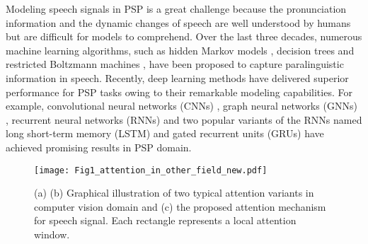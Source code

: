 \documentclass[lettersize,journal]{IEEEtran}
\begin{document}
Modeling speech signals in PSP is a great challenge because the pronunciation information and the dynamic changes of speech are well understood by humans but are difficult  for models to comprehend. Over the last three decades, numerous machine learning algorithms, such as hidden Markov models \cite{HMM1,HMM2,HMM3}, decision trees \cite{Tree2,Tree3} and restricted Boltzmann machines \cite{Boltzmann2,Haizhou3,Boltzmann3}, have been proposed to capture paralinguistic information in speech. Recently, deep learning methods have delivered superior performance for PSP tasks owing to their remarkable modeling capabilities. For example, convolutional neural networks (CNNs) \cite{GCNN, Makiuchi, EmoAudioNet, FVTC-CNN, stc, ISNet, fan2020}, graph neural networks (GNNs) \cite{LSTM-GIN, MM-DFN}, recurrent neural networks (RNNs) \cite{MMFA-RNN, Autoencoder, SER_RNN1} and two popular variants of the RNNs named long short-term memory (LSTM) \cite{Tao1, tao3, Romain1} and gated recurrent units (GRUs) \cite{SER_RNN3} have achieved promising results in PSP domain.

\begin{figure}[t]
\centering
\texttt{[image: Fig1\_attention\_in\_other\_field\_new.pdf]}
\caption{(a) (b) Graphical illustration of two typical attention variants in computer vision domain and (c) the proposed attention mechanism for speech signal. Each rectangle represents a local attention window.
}
\label{fig_1}
\end{figure}
\end{document}

